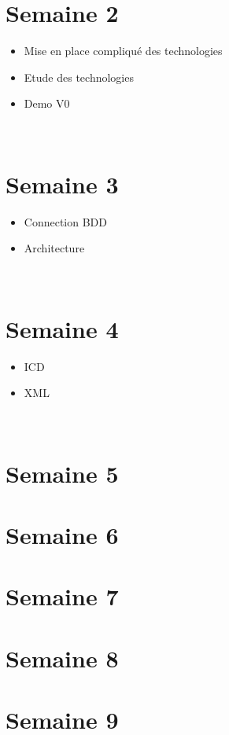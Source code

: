 \documentclass[11pt,fleqn]{book}
\begin{document}
								\chapter{Semaine 2}
\begin{itemize}
\item Mise  en  place  compliqué  des  technologies
\item Etude  des  technologies
\item Demo  V0
\end{itemize}
~\\
								\chapter{Semaine 3}
\begin{itemize}
\item Connection  BDD
\item Architecture
\end{itemize}
~\\
								\chapter{Semaine 4}
\begin{itemize}
\item ICD
\item XML
\end{itemize}
~\\
								\chapter{Semaine 5}
								\chapter{Semaine 6}
								\chapter{Semaine 7}
								\chapter{Semaine 8}
								\chapter{Semaine 9}
\end{document}
